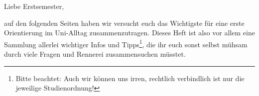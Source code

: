 Liebe Erstsemester,

auf den folgenden Seiten haben wir versucht euch das Wichtigste für eine
erste Orientierung im Uni-Alltag zusammenzutragen. Dieses Heft
ist also vor allem eine Sammlung allerlei wichtiger Infos und Tipps\footnote{
Bitte beachtet: Auch wir können uns irren, rechtlich verbindlich ist nur die
jeweilige Studienordnung!}, die ihr
euch sonst selbst mühsam durch viele Fragen und Rennerei %
zusammensuchen müsstet.


